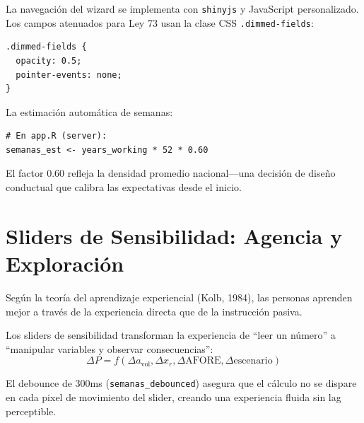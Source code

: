 \documentclass[11pt,a4paper]{report}
\begin{document}
\begin{tcolorbox}[colback=orange!5!white, colframe=orange!75!black, title=\textbf{Aplicaci\'on en C\'odigo}]
La navegaci\'on del wizard se implementa con \texttt{shinyjs} y JavaScript personalizado. Los campos atenuados para Ley 73 usan la clase CSS \texttt{.dimmed-fields}:

\begin{lstlisting}[language={}]
.dimmed-fields {
  opacity: 0.5;
  pointer-events: none;
}
\end{lstlisting}

La estimaci\'on autom\'atica de semanas:
\begin{lstlisting}
# En app.R (server):
semanas_est <- years_working * 52 * 0.60
\end{lstlisting}

El factor 0.60 refleja la densidad promedio nacional---una decisi\'on de dise\~no conductual que calibra las expectativas desde el inicio.
\end{tcolorbox}


\section{Sliders de Sensibilidad: Agencia y Exploraci\'on}

\begin{tcolorbox}[colback=blue!5!white, colframe=blue!75!black, title=\textbf{Definici\'on Formal: Interactividad y Aprendizaje Experiencial}]
Seg\'un la teor\'ia del aprendizaje experiencial (Kolb, 1984), las personas aprenden mejor a trav\'es de la experiencia directa que de la instrucci\'on pasiva.

Los sliders de sensibilidad transforman la experiencia de ``leer un n\'umero'' a ``manipular variables y observar consecuencias'':
\[
  \Delta P = f(\Delta a_{\text{vol}}, \Delta x_r, \Delta \text{AFORE}, \Delta \text{escenario})
\]

El debounce de 300ms (\texttt{semanas\_debounced}) asegura que el c\'alculo no se dispare en cada pixel de movimiento del slider, creando una experiencia fluida sin lag perceptible.
\end{tcolorbox}
\end{document}
